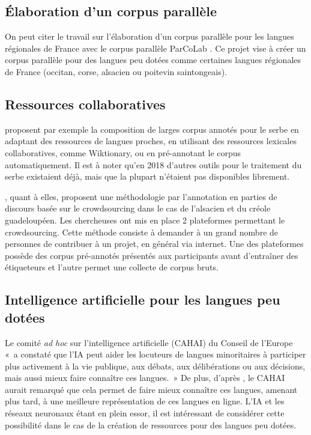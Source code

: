\subsection{Élaboration d'un corpus parallèle}

On peut citer le travail sur l'élaboration d'un corpus parallèle pour les langues
régionales de France avec le corpus parallèle ParCoLab \citep{stosic_2024}. Ce projet vise à créer
un corpus parallèle pour des langues peu dotées comme certaines langues régionales de France
(occitan, corse, alsacien ou poitevin saintongeais).

\subsection{Ressources collaboratives}

\citet{miletic_2018} proposent par exemple la composition de larges corpus annotés pour le serbe en adaptant des ressources de
langues proches, en utilisant des ressources lexicales collaboratives, comme Wiktionary, ou en pré-annotant
le corpus automatiquement. Il est à noter qu'en 2018 d'autres outils pour le traitement du serbe existaient
déjà, mais que la plupart n'étaient pas disponibles librement.

\citet{millour_2018}, quant à elles, proposent une méthodologie par l'annotation en parties de discours basée sur le crowdsourcing dans le cas de l'alsacien et du créole guadeloupéen.
Les chercheuses ont mis en place 2 plateformes permettant le crowdsourcing. Cette méthode consiste à demander à un grand nombre de
personnes de contribuer à un projet, en général via internet. Une des plateformes possède des corpus pré-annotés
présentés aux participants avant d'entraîner des étiqueteurs et l'autre permet une collecte de corpus bruts.

\subsection{Intelligence artificielle pour les langues peu dotées}

Le comité \textit{ad hoc} sur l’intelligence artificielle (\gls{CAHAI}) du Conseil de l’Europe
«~a constaté que l'IA peut aider les locuteurs de langues minoritaires à participer
plus activement à la vie publique, aux débats, aux délibérations ou aux décisions, mais aussi mieux
faire connaître ces langues.~» \citep{gerken_2022} De plus, d'après \citet{gerken_2022}, le CAHAI aurait remarqué que
cela permet de faire mieux connaître ces langues, amenant plus tard, à une meilleure représentation de
ces langues en ligne. L'IA et les réseaux neuronaux étant en plein essor,
il est intéressant de considérer cette possibilité dans le cas de la création de ressources pour des
langues peu dotées.


